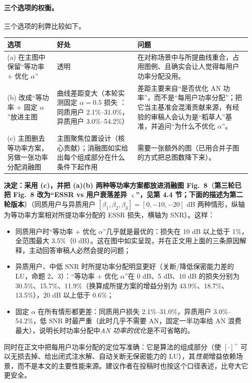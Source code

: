 \documentclass[11pt,a4paper]{ctexart}
\begin{document}
\paragraph{三个选项的权衡。}三个选项的利弊比较如下。\par
\begin{longtable}{p{3.6cm}p{5.7cm}p{6.2cm}}
\toprule
选项 & 好处 & 问题 \\ \midrule
{(a)} 在主图中保留“等功率 + 优化 $\alpha$” & 透明 & 在对称场景中与所提曲线重合，占用图例、且确实会让人觉得每用户功率分配没用。\\
{(b)} 改成“等功率 + 固定 $\alpha$”放进主图 & 曲线差距变大（本轮实测固定 $\alpha=0.5$ 损失 ：同质用户 2.1\%--31.0\%，异质用户 3.0\%--54.2\%） & 差距主要来自“是否优化 AN 功率”，而不是“每用户功率分配”；把它当主基准会混淆贡献来源，有经验的审稿人会认为是“稻草人”基准，并追问“为什么不优化 $\alpha$”。\\
{(c)} 主图删去等功率方案，另做一张功率分配消融图 & 主图聚焦位置设计（核心贡献）；消融图如实给出每个组成部分在什么条件下起作用 & 需要一张额外的图（已用合并子图的方式把总图数降下来）。\\
\bottomrule
\end{longtable}
\textbf{决定：采用 (c)，并把 (a)(b) 两种等功率方案都放进消融图 Fig.~8}（\textbf{第三轮已把 Fig.~8 改为“ESSR vs 用户衰落差异 $\varsigma$”，见第 4.4 节；下面的描述为第二轮版本}）（同质用户与异质用户 $[\beta_1,\beta_2,\beta_3]=[0,-10,-20]$ dB 两种情形，纵轴为等功率方案相对所提功率分配的 ESSR 损失，横轴为 SNR）。这样：
\begin{itemize}
\item 同质用户时“等功率 + 优化 $\alpha$”几乎就是最优的：损失在 10 dB 以上低于 1\%，全范围最大 3.5\%（0 dB）。这在图中如实呈现，并在正文用上面的三条原因解释，主动回答审稿人必然会提的问题；
\item 异质用户、中低 SNR 时所提功率分配明显更好（关断/降低保密能力差的 LU，命题 2、3）：“等功率 + 优化 $\alpha$”在 0 dB、5 dB、10 dB 的损失分别为 30.5\%、15.7\%、11.9\%（换算成所提方案的增益分别为 43.9\%、18.7\%、13.5\%），20 dB 以上低于 0.6\%；
\item 固定 $\alpha$ 在所有情形都更差：同质用户损失 2.1\%--31.0\%，异质用户 3.0\%--54.2\%，低 SNR 时最严重（此时几乎不需要 AN，固定一半功率给 AN 浪费最大），说明长时功率分配中\emph{AN 功率的优化}是不可省略的。
\end{itemize}
同时在正文中把每用户功率分配的定位写准确：它是算法的组成部分（使 $[\cdot]^+$ 可以无损去掉、给出闭式注水解、自动关断无保密能力的 LU），其\emph{性能}增益依赖场景，而不是本文的主要性能来源。建议作者在投稿时也按这个口径表述，比夸大它更安全。
\end{document}
